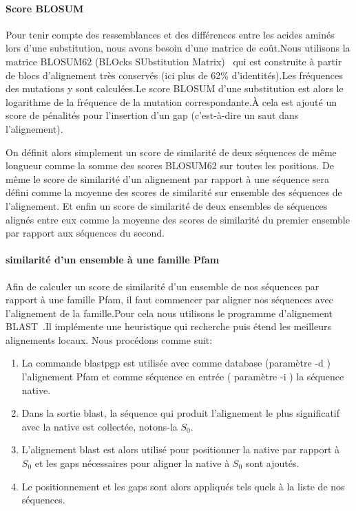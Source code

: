 \paragraph{Score BLOSUM}

Pour tenir compte des ressemblances et des différences entre les acides aminés lors d'une substitution, nous avons besoin d'une matrice de coût.Nous utilisons la matrice BLOSUM62 (BLOcks SUbstitution Matrix)~\citep{refBLOSUM} qui est construite à partir de blocs d'alignement très conservés (ici plus de 62\% d'identités).Les fréquences des mutations y sont calculées.Le score BLOSUM d'une substitution est alors le logarithme de la fréquence de la mutation correspondante.À cela est ajouté un score de pénalités pour l'insertion d'un gap (c'est-à-dire un saut dans l'alignement).

On définit alors simplement un score de similarité de deux séquences de même longueur comme la somme des scores BLOSUM62 sur toutes les positions. De même le score de similarité d'un alignement par rapport à une séquence sera défini comme la moyenne des scores de similarité sur ensemble des séquences de l'alignement. Et enfin un score de similarité de deux ensembles de séquences alignés entre eux comme la moyenne des scores de similarité du premier ensemble par rapport aux séquences du second.  

\paragraph{similarité d'un ensemble à une famille Pfam}

Afin de calculer un score de similarité d'un ensemble de nos séquences par rapport à une famille Pfam, il faut commencer par aligner nos séquences avec l'alignement de la famille.Pour cela nous utilisons le programme d'alignement BLAST~\citep{refBLAST}.Il implémente une heuristique qui recherche puis étend les meilleurs alignements locaux. Nous procédons comme suit:
\begin{enumerate}
\item La commande blastpgp est utilisée avec comme database (paramètre -d ) l'alignement Pfam et comme séquence en entrée ( paramètre -i ) la séquence native. 
\item Dans la sortie blast, la séquence qui produit l'alignement le plus significatif avec la native est collectée, notons-la $S_0$. 
\item L'alignement blast est alors utilisé pour positionner la native par rapport à $S_0$ et les gaps nécessaires pour aligner la native à $S_0$ sont ajoutés.
\item Le positionnement et les gaps sont alors appliqués tels quels à la liste de nos séquences.

\end{enumerate}


\clearpage


